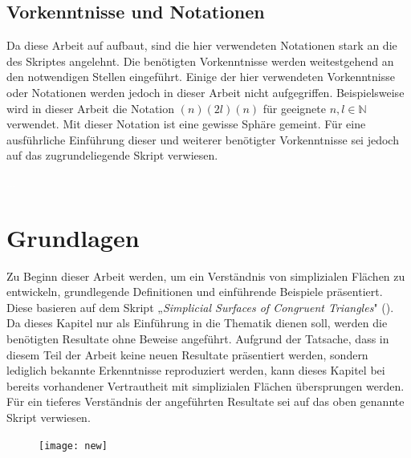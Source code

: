 \documentclass[12pt,titlepage,twoside,cleardoublepage]{article}
\theoremstyle{nummermitklammern}
\numberwithin{equation}{section}
\begin{document}
\subsection{Vorkenntnisse und Notationen}
Da diese Arbeit auf \cite{simp} aufbaut, sind die hier verwendeten Notationen stark an die des Skriptes angelehnt. Die benötigten Vorkenntnisse werden weitestgehend an den notwendigen Stellen eingeführt.
Einige der hier verwendeten Vorkenntnisse oder Notationen werden jedoch in dieser Arbeit nicht aufgegriffen.
 Beispielsweise wird in dieser Arbeit die Notation $(n)(2l)(n)$ für geeignete $n,l\in\mathbb{N}$ verwendet. Mit dieser Notation ist eine gewisse Sphäre gemeint. 
 Für eine ausführliche Einführung dieser und weiterer benötigter Vorkenntnisse sei jedoch auf das zugrundeliegende Skript verwiesen.

\newpage
\textcolor{white}{...}
\newpage
\section{Grundlagen} \label{Grundlagen}
Zu Beginn dieser Arbeit werden, um ein Verständnis von simplizialen Flächen zu entwickeln, grundlegende Definitionen und einführende Beispiele präsentiert. Diese basieren auf dem Skript „\emph{Simplicial Surfaces of Congruent Triangles}" (\cite{simp}). Da dieses Kapitel nur als Einführung in die Thematik dienen soll, werden die benötigten Resultate ohne Beweise angeführt. Aufgrund der Tatsache, dass in diesem Teil der Arbeit keine neuen Resultate präsentiert werden, sondern lediglich bekannte Erkenntnisse reproduziert werden, kann dieses Kapitel bei bereits vorhandener Vertrautheit mit simplizialen Flächen übersprungen werden. Für ein tieferes Verständnis der angeführten Resultate sei auf das oben genannte Skript verwiesen. 
\begin{figure}[H]
\begin{center}
\texttt{[image: new]}
\end{center}
\end{figure}
\end{document}
